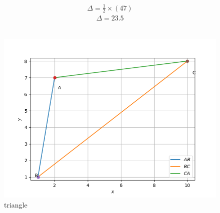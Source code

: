 \documentclass[journal,12pt,twocolumn]{IEEEtran}
\begin{document}
%
\begin{align}
  \Delta =\frac{1}{2}  \times (47)
\end{align}
\begin{align}
  \Delta = 23.5
\end{align}
\\
\begin{figure}[!ht]
\centering
         \includegraphics[width=\columnwidth]{figure_1.png}
         \caption{triangle}
         \label{Figure}
\end{figure}
\\
\end{document}
